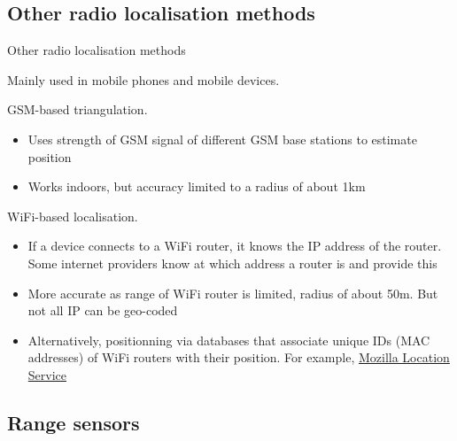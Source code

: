 \documentclass[compress]{beamer}
\begin{document}
\subsection{Other radio localisation methods}

\begin{frame}{Other radio localisation methods}

Mainly used in mobile phones and mobile devices.

GSM-based triangulation.

\begin{itemize}

\item
  Uses strength of GSM signal of different GSM base stations to estimate
  position
\item
  Works indoors, but accuracy limited to a radius of about 1km
\end{itemize}

\pause

WiFi-based localisation.

\begin{itemize}
\item
  If a device connects to a WiFi router, it knows the IP address of the
  router. Some internet providers know at which address a router is and
  provide this
\item More accurate as range of WiFi router is limited, radius of about 50m.
  But not all IP can be geo-coded
\item Alternatively, positionning via databases that associate unique IDs (MAC
    addresses) of WiFi routers with their position. For example,
        \href{https://location.services.mozilla.com/}{Mozilla Location Service}

\end{itemize}

\end{frame}

\subsection{Range sensors}
\end{document}
